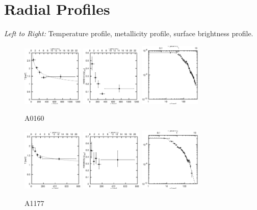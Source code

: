 \documentclass[structabstract]{aa}
\begin{document}
\section{Radial Prof\hspace{0mm}iles}\label{app:profiles}
\emph{Left to Right:} Temperature profile, metallicity profile, surface
brightness profile.
\begin{figure}[h]
   \centering
   \includegraphics[width=0.26\textwidth]{tprofile_a0160.eps}
   \includegraphics[width=0.26\textwidth]{zprofile_a0160.eps}
   \includegraphics[width=0.26\textwidth]{sbps_a0160.eps}
   \caption{A0160}
   \label{fig:tprofa0160}%
\end{figure}
\begin{figure}[h]
   \centering
   \includegraphics[width=0.26\textwidth]{tprofile_a1177.eps}
   \includegraphics[width=0.26\textwidth]{zprofile_a1177.eps}
   \includegraphics[width=0.26\textwidth]{sbps_a1177.eps}
   \caption{A1177}
   \label{fig:tprofa1177}%
\end{figure}
\end{document}
